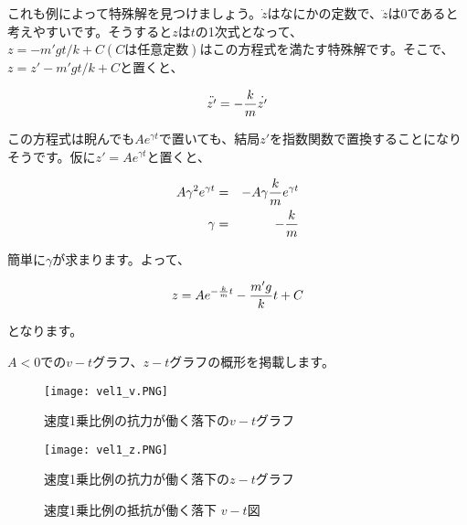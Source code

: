 これも例によって特殊解を見つけましょう。$\dot{z}$はなにかの定数で、$\ddot{z}$は$0$であると考えやすいです。そうすると$z$は$t$の1次式となって、$z=-m'gt/k + C (Cは任意定数)$はこの方程式を満たす特殊解です。そこで、$z = z' - m'gt/k + C$と置くと、

\begin{equation}
    \ddot{z'} =-\frac{k}{m}\dot{z'} \notag
\end{equation}

この方程式は睨んでも$Ae^{\gamma t}$で置いても、結局$z'$を指数関数で置換することになりそうです。仮に$z'=Ae^{\gamma t}$と置くと、

\begin{eqnarray}
    A\gamma^2 e^{\gamma t} &=& -A\gamma\frac{k}{m}e^{\gamma t} \notag \\
    \gamma &=& -\frac{k}{m} \notag
\end{eqnarray}

簡単に$\gamma$が求まります。よって、

\begin{equation}
    z = Ae^{-\frac{k}{m}t} - \frac{m'g}{k}t + C \notag
\end{equation}

となります。

$A<0$での$v-t$グラフ、$z-t$グラフの概形を掲載します。


\begin{figure}[!ht]
  \centering
  \texttt{[image: vel1\_v.PNG]}
  \caption{速度1乗比例の抗力が働く落下の$v-t$グラフ}
  \label{fig:vel1_v}
\end{figure}

\begin{figure}[!ht]
  \centering
  \texttt{[image: vel1\_z.PNG]}
  \caption{速度1乗比例の抗力が働く落下の$z-t$グラフ}
  \label{fig:vel1_z}
\end{figure}
\fi

\begin{figure}[htbp]
\begin{center}
\caption{速度1乗比例の抵抗が働く落下 $v-t$図}
\end{center}
\end{figure}

